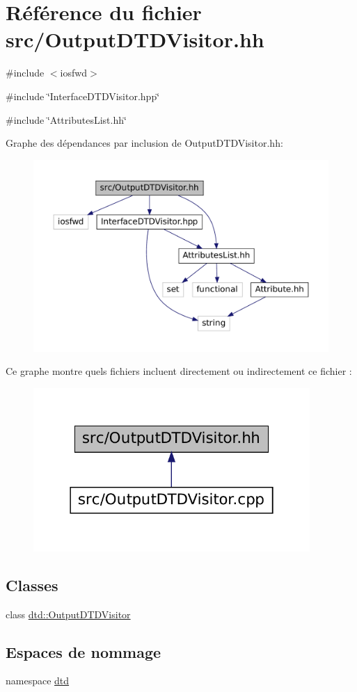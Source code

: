 \hypertarget{_output_d_t_d_visitor_8hh}{
\section{Référence du fichier src/OutputDTDVisitor.hh}
\label{_output_d_t_d_visitor_8hh}
}
{\ttfamily \#include $<$iosfwd$>$}\par
{\ttfamily \#include \char`\"{}InterfaceDTDVisitor.hpp\char`\"{}}\par
{\ttfamily \#include \char`\"{}AttributesList.hh\char`\"{}}\par
Graphe des dépendances par inclusion de OutputDTDVisitor.hh:\nopagebreak
\begin{figure}[H]
\begin{center}
\leavevmode
\includegraphics[width=400pt]{_output_d_t_d_visitor_8hh__incl}
\end{center}
\end{figure}
Ce graphe montre quels fichiers incluent directement ou indirectement ce fichier :\nopagebreak
\begin{figure}[H]
\begin{center}
\leavevmode
\includegraphics[width=298pt]{_output_d_t_d_visitor_8hh__dep__incl}
\end{center}
\end{figure}
\subsection*{Classes}
\begin{DoxyCompactItemize}
\item 
class \hyperlink{classdtd_1_1_output_d_t_d_visitor}{dtd::OutputDTDVisitor}
\end{DoxyCompactItemize}
\subsection*{Espaces de nommage}
\begin{DoxyCompactItemize}
\item 
namespace \hyperlink{namespacedtd}{dtd}
\end{DoxyCompactItemize}
